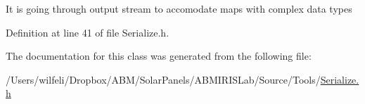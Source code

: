 It is going through output stream to accomodate maps with complex data types 

Definition at line 41 of file Serialize.\+h.



The documentation for this class was generated from the following file\+:\begin{DoxyCompactItemize}
\item 
/\+Users/wilfeli/\+Dropbox/\+A\+B\+M/\+Solar\+Panels/\+A\+B\+M\+I\+R\+I\+S\+Lab/\+Source/\+Tools/\hyperlink{_serialize_8h}{Serialize.\+h}\end{DoxyCompactItemize}
